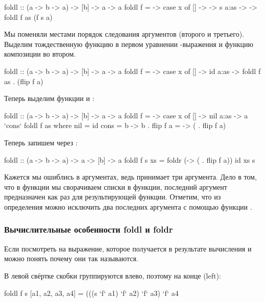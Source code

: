 \begin{code}
foldl :: (a -> b -> a) -> [b] -> a -> a
foldl f = \x -> case x of    
    []      -> \s -> s
    a:as    -> \s -> foldl f as (f s a)
\end{code}

Мы поменяли местами порядок следования аргументов (второго и третьего).
Выделим тождественную функцию в первом уравнении -выражения и
функцию композиции во втором.


\begin{code}
foldl :: (a -> b -> a) -> [b] -> a -> a
foldl f = \x -> case x of    
    []      -> id
    a:as    -> foldl f as . (flip f a)
\end{code}

Теперь выделим функции  и :


\begin{code}
foldl :: (a -> b -> a) -> [b] -> a -> a
foldl f = \x -> case x of    
    []      -> nil 
    a:as    -> a `cons` foldl f as 
    where nil   = id
          cons  = \a b -> b . flip f a
                = \a   -> ( . flip f a)
\end{code}

Теперь запишем через :


\begin{code}
foldl :: (a -> b -> a) -> a -> [b] -> a
foldl f s xs = foldr (\a -> ( . flip f a)) id xs s
\end{code}

Кажется мы ошиблись в аргументах, ведь  принимает три
аргумента. Дело в том, что в функции  мы сворачиваем списки в
функции, последний аргумент предназначен как раз для результирующей
функции. Отметим, что из определения можно исключить два последних
аргумента с помощью функции .

\subsubsection{Вычислительные особенности foldl и foldr}

Если посмотреть на выражение, которое получается в результате вычисления
 и  можно понять почему они так называются.

В левой свёртке  скобки группируются влево, поэтому на конце
 (left):


\begin{code}
foldl f s [a1, a2, a3, a4] =
    (((s `f` a1) `f` a2) `f` a3) `f` a4
\end{code}

